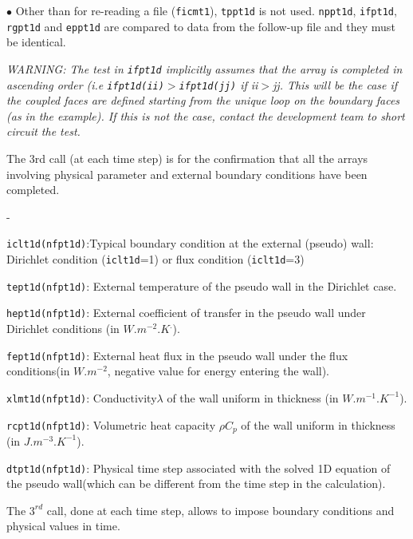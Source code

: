 {{\begin{list}{$\bullet$}{}
Other than for re-reading a file (\texttt{ficmt1}), \texttt{tppt1d} is not used.
\texttt{nppt1d}, \texttt{ifpt1d}, \texttt{rgpt1d} and \texttt{eppt1d} are
compared to data from the follow-up file and they must be identical.

{\em WARNING: The test in \texttt{ifpt1d} implicitly assumes that the array is completed
 in ascending order (i.e \texttt{ifpt1d(ii)}$>$\texttt{ifpt1d(jj)} if ii$>$jj.
 This will be the case if the coupled faces are defined starting from the unique loop on the
boundary faces (as in the example). If this is not the case, contact the development
 team to short circuit the test.}

\item The 3rd call (at each time step) is for the confirmation that all the arrays
 involving physical parameter and external boundary conditions have been completed.
\begin{list}{-}{}
\item \texttt{iclt1d(nfpt1d)}:Typical boundary condition at the external
 (pseudo) wall: Dirichlet condition (\texttt{iclt1d}=1) or flux condition (\texttt{iclt1d}=3)
\item \texttt{tept1d(nfpt1d)}: External temperature of the pseudo wall in the
 Dirichlet case.
\item \texttt{hept1d(nfpt1d)}: External coefficient of transfer in the pseudo
 wall under Dirichlet conditions (in $W.m^{-2}.K^.$).
\item \texttt{fept1d(nfpt1d)}: External heat flux in the pseudo wall under
 the flux conditions(in $W.m^{-2}$, negative value for energy entering the wall).
\item \texttt{xlmt1d(nfpt1d)}: Conductivity$\lambda$ of the wall uniform
in thickness (in $W.m^{-1}.K^{-1}$).
\item \texttt{rcpt1d(nfpt1d)}: Volumetric heat capacity $\rho C_p$ of the
wall uniform in thickness (in $J.m^{-3}.K^{-1}$).
\item \texttt{dtpt1d(nfpt1d)}: Physical time step associated with the solved
 1D equation of the pseudo wall(which can be different from the time step in the
 calculation).
\end{list}

\end{list}

The $3^{rd}$ call, done at each time step, allows to impose boundary conditions
 and physical values in time.

}}

